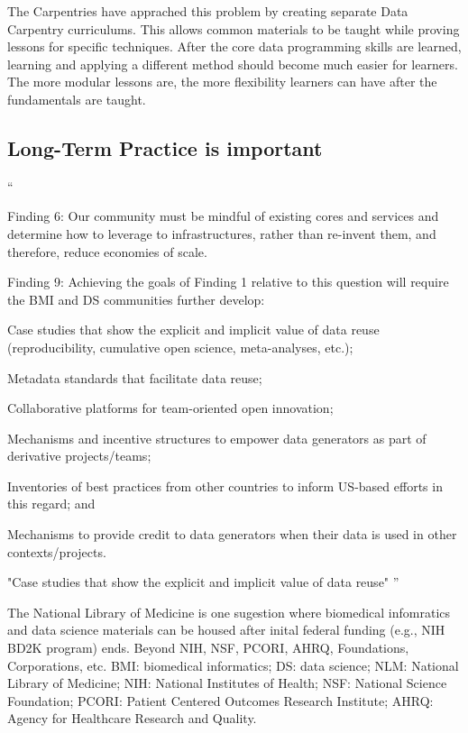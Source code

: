 \documentclass[030-workshop.tex]{subfiles}
\begin{document}
        The Carpentries have apprached this problem by creating separate Data Carpentry curriculums.
        This allows common materials to be taught while proving lessons for specific techniques.
        After the core data programming skills are learned,
        learning and applying a different method should become much easier for learners.
        The more modular lessons are, the more flexibility learners can have after the fundamentals are taught.

    \subsection{Long-Term Practice is important}

    ``

    Finding 6: Our community must be mindful of existing cores and services and determine how to leverage to infrastructures, rather than re-invent them, and therefore, reduce economies of scale.


    Finding 9: Achieving the goals of Finding 1 relative to this question will require the BMI and DS communities further develop:

    Case studies that show the explicit and implicit value of data reuse (reproducibility, cumulative open science, meta-analyses, etc.);

    Metadata standards that facilitate data reuse;

    Collaborative platforms for team-oriented open innovation;

    Mechanisms and incentive structures to empower data generators as part of derivative projects/teams;

    Inventories of best practices from other countries to inform US-based efforts in this regard; and

    Mechanisms to provide credit to data generators when their data is used in other contexts/projects.

        "Case studies that show the explicit and implicit value of data reuse" \cite{payneBiomedicalInformaticsMeets2018}
        ''

        The National Library of Medicine is one sugestion where biomedical infomratics and data science materials can be housed \cite{payneBiomedicalInformaticsMeets2018} after inital federal funding (e.g., NIH BD2K program) ends.
        Beyond NIH,
        \cite{payneBiomedicalInformaticsMeets2018}
        NSF, PCORI, AHRQ, Foundations, Corporations, etc.
        BMI: biomedical informatics; DS: data science; NLM: National Library of Medicine; NIH: National Institutes of Health; NSF: National Science Foundation; PCORI: Patient Centered Outcomes Research Institute; AHRQ: Agency for Healthcare Research and Quality.
\end{document}

